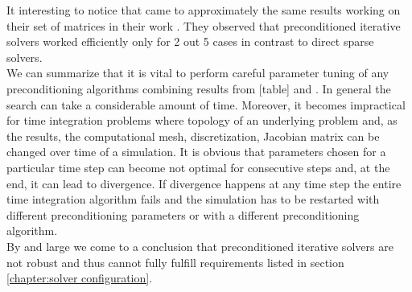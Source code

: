 It interesting to notice that \citeauthor{wsmp} came to approximately the same results working on their set of matrices in their work \cite{wsmp}. They observed that preconditioned iterative solvers worked efficiently only for 2 out 5 cases in contrast to direct sparse solvers.\\

We can summarize that it is vital to perform careful parameter tuning of any preconditioning algorithms combining results from [table] and \cite{wsmp}. In general the  search can take a considerable amount of time. Moreover, it becomes impractical for time integration problems where topology of an underlying problem and, as the results, the computational mesh, discretization, Jacobian matrix can be changed over time of a simulation. It is obvious that parameters chosen for a particular time step can become not optimal for consecutive steps and, at the end, it can lead to divergence. If divergence happens at any time step the entire time integration algorithm fails and the simulation has to be restarted with different preconditioning parameters or with a different preconditioning algorithm.\\

By and large we come to a conclusion that preconditioned iterative solvers are not robust and thus cannot fully fulfill requirements listed in section \ref{chapter:solver configuration}.\\

